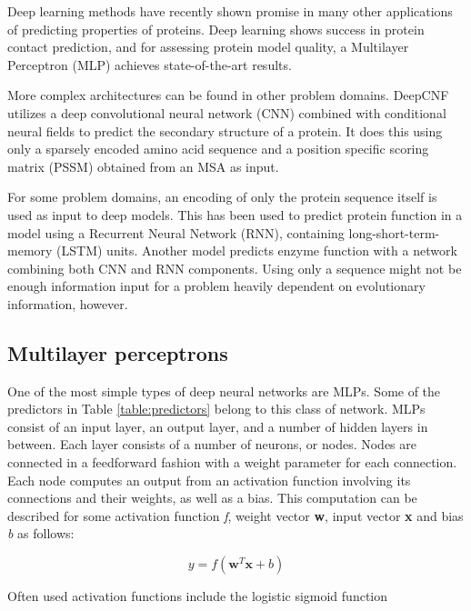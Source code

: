 Deep learning methods have recently shown promise in many other applications of predicting properties of proteins. Deep learning shows success in protein contact prediction\cite{skwark2014improved}, and for assessing protein model quality, a Multilayer Perceptron (MLP) achieves state-of-the-art results.\cite{uziela2017proq3d} 

More complex architectures can be found in other problem domains. DeepCNF\cite{wang2016protein} utilizes a deep convolutional neural network (CNN) combined with conditional neural fields\cite{peng2009conditional} to predict the secondary structure of a protein. It does this using only a sparsely encoded amino acid sequence and a position specific scoring matrix (PSSM) obtained from an MSA as input.

For some problem domains, an encoding of only the protein sequence itself is used as input to deep models. This has been used to predict protein function in a model using a Recurrent Neural Network (RNN), containing long-short-term-memory (LSTM) units.\cite{liu2017deep} Another model predicts enzyme function with a network combining both CNN and RNN components.\cite{li2017deepre} Using only a sequence might not be enough information input for a problem heavily dependent on evolutionary information, however.

\subsection{Multilayer perceptrons}

One of the most simple types of deep neural networks are MLPs. Some of the predictors in Table \ref{table:predictors} belong to this class of network. MLPs consist of an input layer, an output layer, and a number of hidden layers in between. Each layer consists of a number of neurons, or nodes. Nodes are connected in a feedforward fashion with a weight parameter for each connection. Each node computes an output from an activation function involving its connections and their weights, as well as a bias. This computation can be described for some activation function \textit{f}, weight vector \textbf{w}, input vector \textbf{x} and bias \textit{b} as follows:

\begin{equation}
y = f(\mathbf{w}^T\mathbf{x} + b)
\end{equation}

Often used activation functions include the logistic sigmoid function

